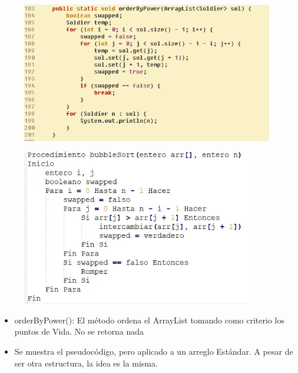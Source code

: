 \documentclass{article}
\begin{document}
		
		
	\begin{figure}[H]
		\centering
		\includegraphics[width=0.98\textwidth,keepaspectratio]{img/orderByPower.png}
	\end{figure}
	
	\begin{figure}[H]
		\centering
		\includegraphics[width=0.9\textwidth,keepaspectratio]{img/burbuja.jpg}
	\end{figure}
	
	
	\begin{itemize}	
		\item orderByPower(): El método ordena el ArrayList tomando como criterio los puntos de Vida. No se retorna nada
		\item Se muestra el pseudocódigo, pero aplicado a un arreglo Estándar. A pesar de ser otra estructura, la idea es la misma.
	\end{itemize}
		
\end{document}
